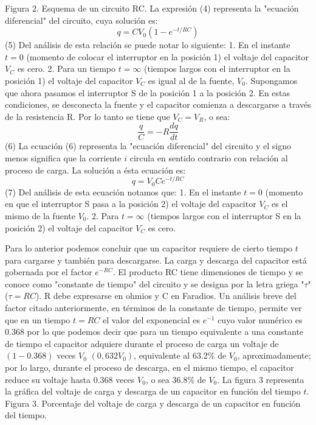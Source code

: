 \documentclass[11pt,a4paper]{article}
\begin{document}
Figura 2. Esquema de un circuito RC. La expresión (4) representa la "ecuación diferencial" del circuito, cuya solución es: \[ q=C V_{0}\left(1-e^{-t / R C}\right) \] (5) Del análisis de esta relación se puede notar lo siguiente: 1. En el instante $t=0$ (momento de colocar el interruptor en la posición 1) el voltaje del capacitor $V_{C}$ es cero. 2. Para un tiempo $t=\infty$ (tiempos largos con el interruptor en la posición 1) el voltaje del capacitor $V_{C}$ es igual al de la fuente, $V_{0}$. Supongamos que ahora pasamos el interruptor S de la posición 1 a la posición 2. En estas condiciones, se desconecta la fuente y el capacitor comienza a descargarse a través de la resistencia R. Por lo tanto se tiene que $V_{C}=V_{R}$, o sea: \[ \frac{q}{C}=-R \frac{d q}{d t} \] (6) La ecuación (6) representa la "ecuación diferencial" del circuito y el signo menos significa que la corriente $i$ circula en sentido contrario con relación al proceso de carga. La solución a ésta ecuación es: \[ q=V_{0} C e^{-t / R C} \] (7) Del análisis de esta ecuación notamos que: 1. En el instante $t=0$ (momento en que el interruptor S pasa a la posición 2) el voltaje del capacitor $V_{C}$ es el mismo de la fuente $V_{0}$. 2. Para $t=\infty$ (tiempos largos con el interruptor S en la posición 2) el voltaje del capacitor $V_{C}$ es cero.

Para lo anterior podemos concluir que un capacitor requiere de cierto tiempo $t$ para cargarse y también para descargarse. La carga y descarga del capacitor está gobernada por el factor $e^{-RC}$. El producto RC tiene dimensiones de tiempo y se conoce como "constante de tiempo" del circuito y se designa por la letra griega "$\tau$" ($\tau=RC$). R debe expresarse en ohmios y C en Faradios. Un análisis breve del factor citado anteriormente, en términos de la constante de tiempo, permite ver que en un tiempo $t=RC$ el valor del exponencial es $e^{-1}$ cuyo valor numérico es 0.368 por lo que podemos decir que para un tiempo equivalente a una constante de tiempo el capacitor adquiere durante el proceso de carga un voltaje de $(1-0.368)$ veces $V_{0}$ $(0,632V_{0})$, equivalente al 63.2\% de $V_{0}$, aproximadamente; por lo largo, durante el proceso de descarga, en el mismo tiempo, el capacitor reduce su voltaje hasta 0.368 veces $V_{0}$, o sea 36.8\% de $V_{0}$. La figura 3 representa la gráfica del voltaje de carga y descarga de un capacitor en función del tiempo $t$. Figura 3. Porcentaje del voltaje de carga y descarga de un capacitor en función del tiempo.
\end{document}
